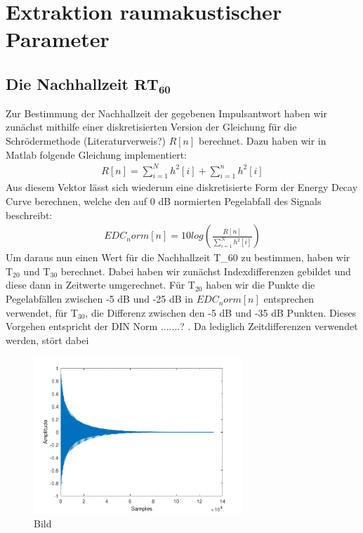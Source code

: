 \chapter{Extraktion raumakustischer Parameter}
\section{Die Nachhallzeit $\mathbf{RT_{60}}$}
\label{sec:rt60}

Zur Bestimmung der Nachhallzeit der gegebenen Impulsantwort haben wir zunächst mithilfe einer diskretisierten Version der Gleichung für die Schrödermethode (Literaturverweis?) $R[n]$ berechnet. Dazu haben wir in Matlab folgende Gleichung implementiert:
\begin{align*}
R[n] = \sum_{i=1}^N h^2[i] + \sum_{i=1}^n h^2[i]
\end{align*}
Aus diesem Vektor lässt sich wiederum eine diskretisierte Form der Energy Decay Curve berechnen, welche den auf 0 dB normierten Pegelabfall des Signals  beschreibt:
\begin{align*}
EDC_norm[n] = 10 log (\frac{R[n]}{\sum_{i=1}^N h^2[i]})
\end{align*}
Um daraus nun einen Wert für die Nachhallzeit T_$60$ zu bestimmen, haben wir T$_{20}$ und T$_{30}$ berechnet. Dabei haben wir zunächst Indexdifferenzen gebildet und diese dann in Zeitwerte umgerechnet.
Für T$_{20}$ haben wir die Punkte die Pegelabfällen zwischen -5 dB und -25 dB in $EDC_norm[n]$ entsprechen verwendet, für T$_{30}$, die Differenz zwischen den -5 dB und -35 dB Punkten.
Dieses Vorgehen entspricht der DIN Norm .......? .
Da lediglich Zeitdifferenzen verwendet werden, stört dabei 




\begin{figure}[H]
    \center
    \includegraphics[width = 0.7\textwidth]{figures/samples.pdf}
    \caption{Bild}
    \label{fig:bs1}
\end{figure}



